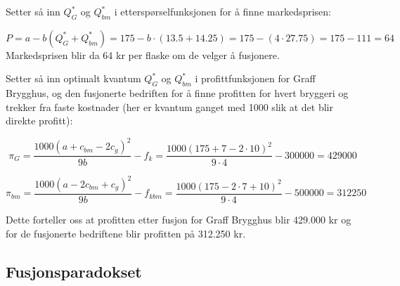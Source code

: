 \documentclass[
  12pt,
  a4paper,
  DIV=11,
  numbers=noendperiod]{scrartcl}
\begin{document}
Setter så inn \(Q_G^*\) og \(Q_{bm}^*\) i etterspørselfunksjonen for å
finne markedsprisen:

\[P = a - b(Q_G^*+Q_{bm}^*) = 175 - b \cdot (13.5 + 14.25) = 175 - (4 \cdot 27.75)  = 175 - 111 = 64 \tag{34}\]
Markedsprisen blir da 64 kr per flaske om de velger å fusjonere.

Setter så inn optimalt kvantum \(Q_G^*\) og \(Q_{bm}^*\) i
profittfunksjonen for Graff Brygghus, og den fusjonerte bedriften for å
finne profitten for hvert bryggeri og trekker fra faste kostnader (her
er kvantum ganget med 1000 slik at det blir direkte profitt):

\[ \pi_G = \frac{1000(a+c_{bm}-2c_g)^2}{9b} -f_k = \frac{1000(175+7 - 2 \cdot 10)^2}{9 \cdot 4} -300000 = 429000 \tag{35}\]

\[ \pi_{bm} = \frac{1000(a-2c_{bm}+c_g)^2}{9b} -f_{kbm} = \frac{1000(175-2 \cdot 7+10)^2}{9 \cdot 4} -500000 = 312250 \tag{36}\]

Dette forteller oss at profitten etter fusjon for Graff Brygghus blir
429.000 kr og for de fusjonerte bedriftene blir profitten på 312.250 kr.

\subsection{Fusjonsparadokset}\label{fusjonsparadokset}
\end{document}

